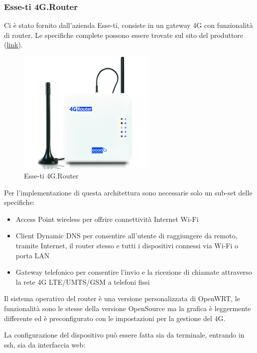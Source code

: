\subsubsection{Esse-ti 4G.Router \workinprogress}

Ci è stato fornito dall'azienda Esse-ti, consiste in un gateway 4G con funzionalità di router. Le specifiche complete possono essere trovate sul sito del produttore (\href{https://www.esse-ti.it/4g-router}{link}).


\begin{figure}[ht]
	\centering
	\includegraphics[width=250px]{immagini/4grouter.jpg}
	\caption{Esse-ti 4G.Router}
	\label{fig:esse-ti-router-4g}
\end{figure}

Per l'implementazione di questa architettura sono necessarie solo un sub-set delle specifiche:

\begin{itemize}
	\item Access Point wireless per offrire connettività Internet Wi-Fi
 
	\item Client Dynamic DNS per consentire all’utente di raggiungere da remoto, tramite Internet, il router stesso e tutti i dispositivi connessi via Wi-Fi o porta LAN
	
	\item Gateway telefonico per consentire l’invio e la ricezione di chiamate attraverso la rete 4G LTE/UMTS/GSM a telefoni fissi
\end{itemize}

Il sistema operativo del router è una versione personalizzata di OpenWRT, le funzionalità sono le stesse della versione OpenSource ma la grafica è leggermente differente ed è preconfigurato con le impostazioni per la gestione del 4G.

La configurazione del dispositivo può essere fatta sia da terminale, entrando in ssh, sia da interfaccia web:

